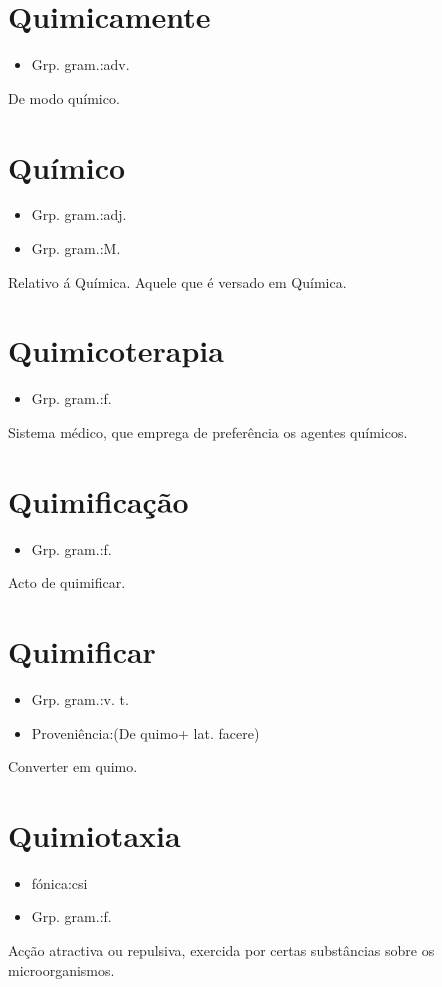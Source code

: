 \section{Quimicamente}
\begin{itemize}
\item {Grp. gram.:adv.}
\end{itemize}
De modo químico.
\section{Químico}
\begin{itemize}
\item {Grp. gram.:adj.}
\end{itemize}
\begin{itemize}
\item {Grp. gram.:M.}
\end{itemize}
Relativo á \textunderscore Química\textunderscore .
Aquele que é versado em Química.
\section{Quimicoterapia}
\begin{itemize}
\item {Grp. gram.:f.}
\end{itemize}
Sistema médico, que emprega de preferência os agentes químicos.
\section{Quimificação}
\begin{itemize}
\item {Grp. gram.:f.}
\end{itemize}
Acto de quimificar.
\section{Quimificar}
\begin{itemize}
\item {Grp. gram.:v. t.}
\end{itemize}
\begin{itemize}
\item {Proveniência:(De \textunderscore quimo\textunderscore  + lat. \textunderscore facere\textunderscore )}
\end{itemize}
Converter em quimo.
\section{Quimiotaxia}
\begin{itemize}
\item {fónica:csi}
\end{itemize}
\begin{itemize}
\item {Grp. gram.:f.}
\end{itemize}
Acção atractiva ou repulsiva, exercida por certas substâncias sobre os microorganismos.
